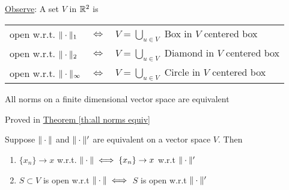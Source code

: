 \underline{Observe}: A set $V$ in $\mathbb{R}^2$ is
\begin{center}
	\begin{tabular}{lcl}
		open w.r.t. $\|\cdot\|_1$ & $\iff$ & $V=\bigcup\limits_{u\in V}$ Box in $V$ centered box     \\
		open w.r.t. $\|\cdot\|_2$ & $\iff$ & $V=\bigcup\limits_{u\in V}$ Diamond in $V$ centered box \\
		open w.r.t. $\|\cdot\|_{\infty}$  & $\iff$ & $V=\bigcup\limits_{u\in V}$ Circle in $V$ centered box
	\end{tabular}
\end{center}
\begin{theorem}{}{}
	All norms on a finite dimensional vector space are equivalent
\end{theorem}
\begin{myproof}
	Proved in \hyperref[th:all norms equiv]{Theorem \ref{th:all norms equiv}}
\end{myproof}
\begin{theorem}{}{}
	Suppose $\|\cdot\|$ and $\|\cdot\|'$ are equivalent on a vector space $V$. Then \begin{enumerate}[label=(\roman*)]
		\item $\{x_n\}\to x$ w.r.t. $\|\cdot\|\iff \{x_n\}\to x$ w.r.t $\|\cdot\|'$
		\item $S\subset V$ is open w.r.t $\|\cdot\|\iff$ $S$ is open w.r.t $\|\cdot\|'$
	\end{enumerate}
\end{theorem}
